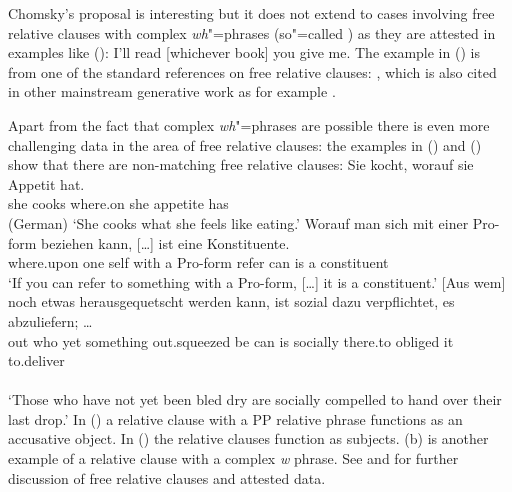 \documentclass[output=paper]{langsci/langscibook}
\begin{document}
Chomsky's proposal is interesting but it does not extend to cases involving free relative clauses
with complex \emph{wh}"=phrases (so"=called ) as they are attested in examples like (): 
\ea
I'll read [whichever book] you give me.
\z
The example in () is from one of the standard references on free relative clauses:
, which is also cited in other mainstream generative work as for example
\citep{GR81}.

Apart from the fact that complex \emph{wh}"=phrases are possible there is even more challenging data in the area of
free relative clauses: the examples in () and () show that there are non-matching free
relative clauses:
\ea
\gll Sie kocht, worauf   sie Appetit  hat.\footnotemark\\
     she cooks  where.on she appetite has\\\hfill(German)
\glt `She cooks what she feels like eating.'
\z
\eal
\ex
\gll Worauf man sich mit einer Pro-form beziehen kann, [\ldots]  ist eine Kon\-sti\-tu\-en\-te.\footnotemark\\
     where.upon one self with a Pro-form  refer   can  {}        is  a    constituent\\
\glt `If you can refer to something with a Pro-form, [\ldots] it is a constituent.'
\ex
\gll {}[Aus wem] noch etwas herausgequetscht werden kann, ist sozial dazu ver\-pflich\-tet, es
abzuliefern; \ldots\label{bsp-droste}\footnotemark\\
  \spacebr{}out who yet something out.squeezed be can is socially there.to obliged it to.deliver\\
\\
\glt `Those who have not yet been bled dry are socially compelled to hand over their last drop.'
\zl
In () a relative clause with a PP relative phrase functions as an accusative object. In
() the relative clauses function as subjects. (b) is another example of a relative
clause with a complex \emph{w} phrase. See \citet{Bausewein90} and \citet{Mueller99b} for further discussion of free relative
clauses and attested data.
\end{document}
